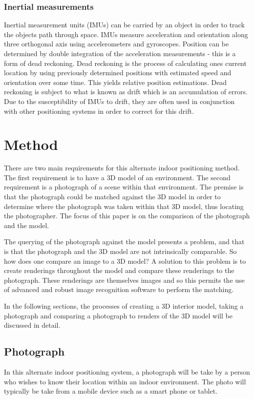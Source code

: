 \documentclass[11pt,a4paper]{report}
\begin{document}
	\subsection{Inertial measurements}
		Inertial measurement units (IMUs) can be carried by an object in order to track the objects path through space. IMUs measure acceleration and orientation along three orthogonal axis using accelerometers and gyroscopes. Position can be determined by double integration of the acceleration measurements - this is a form of dead reckoning. Dead reckoning is the process of calculating ones current location by using previously determined positions with estimated speed and orientation over some time. This yields relative position estimations. Dead reckoning is subject to what is known as drift which is an accumulation of errors. Due to the susceptibility of IMUs to drift, they are often used in conjunction with other positioning systems in order to correct for this drift.

\newpage
\chapter{Method}
	There are two main requirements for this alternate indoor positioning method. The first requirement is to have a 3D model of an environment. The second requirement is a photograph of a scene within that environment. The premise is that the photograph could be matched against the 3D model in order to determine where the photograph was taken within that 3D model, thus locating the photographer. The focus of this paper is on the comparison of the photograph and the model.
	
	The querying of the photograph against the model presents a problem, and that is that the photograph and the 3D model are not intrinsically comparable. So how does one compare an image to a 3D model? A solution to this problem is to create renderings throughout the model and compare these renderings to the photograph. These renderings are themselves images and so this permits the use of advanced and robust image recognition software to perform the matching.
	
	In the following sections, the processes of creating a 3D interior model, taking a photograph and comparing a photograph to renders of the 3D model will be discussed in detail.
	
	\section{Photograph}
		In this alternate indoor positioning system, a photograph will be take by a person who wishes to know their location within an indoor environment. The photo will typically be take from a mobile device such as a smart phone or tablet.
	
\end{document}
